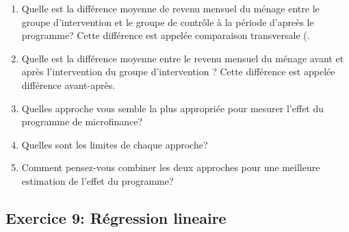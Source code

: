 \documentclass[]{article}
\begin{document}
\begin{enumerate}
\def\labelenumi{\arabic{enumi}.}
\item
  Quelle est la différence moyenne de revenu mensuel du ménage entre le
  groupe d'intervention et le groupe de contrôle à la période d'apreès
  le programme? Cette différence est appelée comparaison transversale (.
\item
  Quelle est la différence moyenne entre le revenu mensuel du ménage
  avant et après l'intervention du groupe d'intervention ? Cette
  différence est appelée différence avant-après.
\item
  Quelles approche vous semble la plus appropriée pour mesurer l'effet
  du programme de microfinance?
\item
  Quelles sont les limites de chaque approche?
\item
  Comment pensez-vous combiner les deux approches pour une meilleure
  estimation de l'effet du programme?
\end{enumerate}

\subsection{Exercice 9: Régression
lineaire}\label{exercice-9-regression-lineaire}
\end{document}

